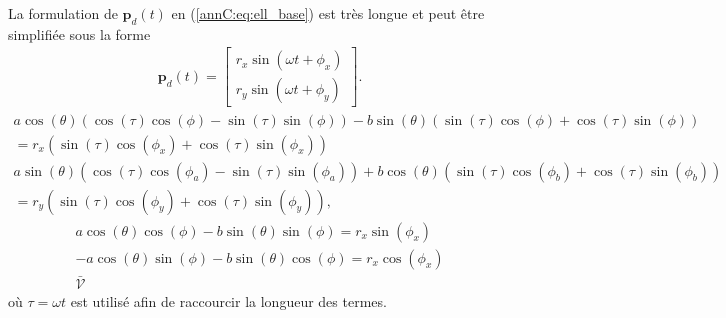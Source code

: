 La formulation de $\mathbf{p}_d(t)$ en (\ref{annC:eq:ell_base}) est très longue et peut être simplifiée sous la forme \begin{align}
\mathbf{p}_d(t) = \begin{bmatrix}
r_x\sin(\omega t+\phi_x)\\
r_y\sin(\omega t+\phi_y)
\end{bmatrix}.
\label{annC:eq:gen_ell_simp}
\end{align}
\begin{multline}
a\cos(\theta)\left(\cos(\tau)\cos(\phi)-\sin(\tau)\sin(\phi)\right)-b\sin(\theta)\left(\sin(\tau)\cos(\phi)+\cos(\tau)\sin(\phi)\right) \\ = r_x(\sin(\tau)\cos(\phi_x)+\cos(\tau)\sin(\phi_x))
\end{multline}
\begin{multline}
a\sin(\theta)\left(\cos(\tau)\cos(\phi_a)-\sin(\tau)\sin(\phi_a)\right)+b\cos(\theta)\left(\sin(\tau)\cos(\phi_b)+\cos(\tau)\sin(\phi_b)\right)  \\ = r_y(\sin(\tau)\cos(\phi_y)+\cos(\tau)\sin(\phi_y)),
\end{multline}
\begin{align}
a\cos(\theta)\cos(\phi)-b\sin(\theta)\sin(\phi)=r_x\sin(\phi_x)\\
-a\cos(\theta)\sin(\phi)-b\sin(\theta)\cos(\phi)=r_x\cos(\phi_x)\\
\bar{\mathcal{V}}
\end{align}
où $\tau=\omega t$ est utilisé afin de raccourcir la longueur des termes.



















